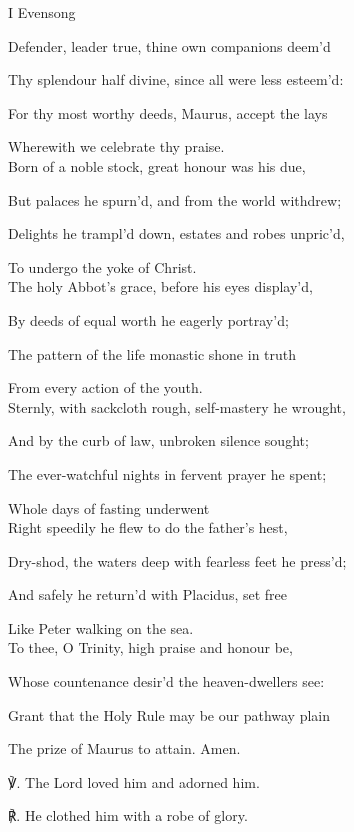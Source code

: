 \begin{inhead}
	I Evensong
\end{inhead}

\begin{multicols}{2}
\begin{hangparas}{1.25em}{1}
Defender, leader true, thine own companions deem'd

Thy splendour half divine, since all were less esteem'd:

For thy most worthy deeds, Maurus, accept the lays

Wherewith we celebrate thy praise.\\

Born of a noble stock, great honour was his due,

But palaces he spurn'd, and from the world withdrew;

Delights he trampl'd down, estates and robes unpric'd,

To undergo the yoke of Christ.\\

The holy Abbot's grace, before his eyes display'd,

By deeds of equal worth he eagerly portray'd;

The pattern of the life monastic shone in truth

From every action of the youth.\\

Sternly, with sackcloth rough, self-mastery he wrought,

And by the curb of law, unbroken silence sought;

The ever-watchful nights in fervent prayer he spent;

Whole days of fasting underwent\\

Right speedily he flew to do the father's hest,

Dry-shod, the waters deep with fearless feet he press'd;

And safely he return'd with Placidus, set free

Like Peter walking on the sea.\\

To thee, O Trinity, high praise and honour be,

Whose countenance desir'd the heaven-dwellers see:

Grant that the Holy Rule may be our pathway plain

The prize of Maurus to attain.  Amen.\\
\end{hangparas}

℣. The Lord loved him and adorned him.

℟. He clothed him with a robe of glory.
\end{multicols}

